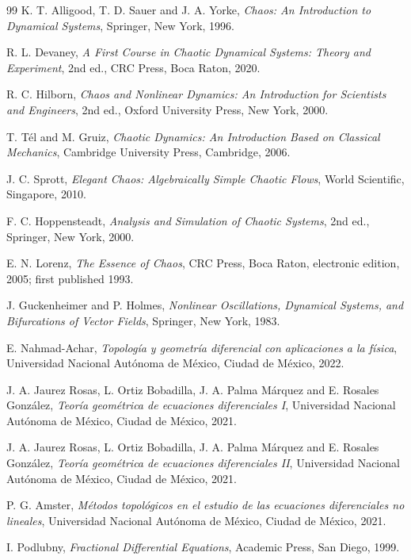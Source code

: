 \documentclass[11pt,a4paper]{article}
\begin{document}
\begin{thebibliography}{99}
K. T. Alligood, T. D. Sauer and J. A. Yorke, \emph{Chaos: An Introduction to
Dynamical Systems}, Springer, New York, 1996.

R. L. Devaney, \emph{A First Course in Chaotic Dynamical Systems: Theory and
Experiment}, 2nd ed., CRC Press, Boca Raton, 2020.

R. C. Hilborn, \emph{Chaos and Nonlinear Dynamics: An Introduction for
Scientists and Engineers}, 2nd ed., Oxford University Press, New York, 2000.

T. Tél and M. Gruiz, \emph{Chaotic Dynamics: An Introduction Based on
Classical Mechanics}, Cambridge University Press, Cambridge, 2006.

J. C. Sprott, \emph{Elegant Chaos: Algebraically Simple Chaotic Flows},
World Scientific, Singapore, 2010.

F. C. Hoppensteadt, \emph{Analysis and Simulation of Chaotic Systems},
2nd ed., Springer, New York, 2000.

E. N. Lorenz, \emph{The Essence of Chaos}, CRC Press, Boca Raton, electronic
edition, 2005; first published 1993.

J. Guckenheimer and P. Holmes, \emph{Nonlinear Oscillations, Dynamical
Systems, and Bifurcations of Vector Fields}, Springer, New York, 1983.

E. Nahmad-Achar, \emph{Topología y geometría diferencial con aplicaciones a la
física}, Universidad Nacional Autónoma de México, Ciudad de México, 2022.

J. A. Jaurez Rosas, L. Ortiz Bobadilla, J. A. Palma Márquez and E. Rosales González,
\emph{Teoría geométrica de ecuaciones diferenciales I}, Universidad Nacional Autónoma
de México, Ciudad de México, 2021.

J. A. Jaurez Rosas, L. Ortiz Bobadilla, J. A. Palma Márquez and E. Rosales González,
\emph{Teoría geométrica de ecuaciones diferenciales II}, Universidad Nacional
Autónoma de México, Ciudad de México, 2021.

P. G. Amster, \emph{Métodos topológicos en el estudio de las ecuaciones diferenciales
no lineales}, Universidad Nacional Autónoma de México, Ciudad de México, 2021.

I. Podlubny, \emph{Fractional Differential Equations}, Academic Press, San Diego,
1999.


\end{thebibliography}
\end{document}
